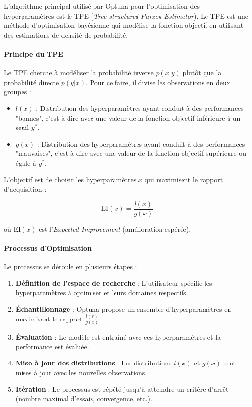 \documentclass[unnumsec,webpdf,modern,large]{projet_manifold}%
\theoremstyle{thmstyleone}%
\theoremstyle{thmstyletwo}%
\theoremstyle{thmstylethree}%
\begin{document}
L'algorithme principal utilisé par Optuna pour l'optimisation des hyperparamètres est le TPE (\textit{Tree-structured Parzen Estimator}). Le TPE est une méthode d'optimisation bayésienne qui modélise la fonction objectif en utilisant des estimations de densité de probabilité.

\paragraph{Principe du TPE}

Le TPE cherche à modéliser la probabilité inverse $p(x|y)$ plutôt que la probabilité directe $p(y|x)$. Pour ce faire, il divise les observations en deux groupes :

\begin{itemize} \item $l(x)$ : Distribution des hyperparamètres ayant conduit à des performances "bonnes", c'est-à-dire avec une valeur de la fonction objectif inférieure à un seuil $y^\ast$. \item $g(x)$ : Distribution des hyperparamètres ayant conduit à des performances "mauvaises", c'est-à-dire avec une valeur de la fonction objectif supérieure ou égale à $y^\ast$. \end{itemize}

L'objectif est de choisir les hyperparamètres $x$ qui maximisent le rapport d'acquisition :

\begin{equation} \mathrm{EI}(x) = \frac{l(x)}{g(x)} \end{equation}

où $\mathrm{EI}(x)$ est l'\textit{Expected Improvement} (amélioration espérée).

\paragraph{Processus d'Optimisation}

Le processus se déroule en plusieurs étapes :

\begin{enumerate} \item \textbf{Définition de l'espace de recherche} : L'utilisateur spécifie les hyperparamètres à optimiser et leurs domaines respectifs. \item \textbf{Échantillonnage} : Optuna propose un ensemble d'hyperparamètres en maximisant le rapport $\frac{l(x)}{g(x)}$. \item \textbf{Évaluation} : Le modèle est entraîné avec ces hyperparamètres et la performance est évaluée. \item \textbf{Mise à jour des distributions} : Les distributions $l(x)$ et $g(x)$ sont mises à jour avec les nouvelles observations. \item \textbf{Itération} : Le processus est répété jusqu'à atteindre un critère d'arrêt (nombre maximal d'essais, convergence, etc.). \end{enumerate}
\end{document}
